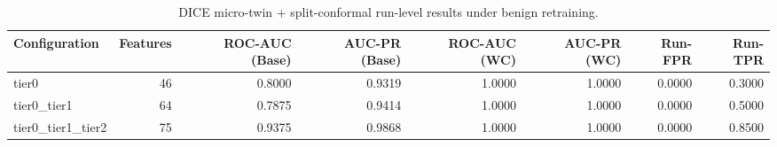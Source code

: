 \begin{table}[t]
\centering
\caption{DICE micro-twin + split-conformal run-level results under benign retraining.}
\label{tab:dice_full_overall}
\footnotesize
\begin{tabular}{lrrrrrrr}
\toprule
Configuration & Features & ROC-AUC (Base) & AUC-PR (Base) & ROC-AUC (WC) & AUC-PR (WC) & Run-FPR & Run-TPR \\
\midrule
tier0 & 46 & 0.8000 & 0.9319 & 1.0000 & 1.0000 & 0.0000 & 0.3000 \\
tier0_tier1 & 64 & 0.7875 & 0.9414 & 1.0000 & 1.0000 & 0.0000 & 0.5000 \\
tier0_tier1_tier2 & 75 & 0.9375 & 0.9868 & 1.0000 & 1.0000 & 0.0000 & 0.8500 \\
\bottomrule
\end{tabular}

\end{table}
